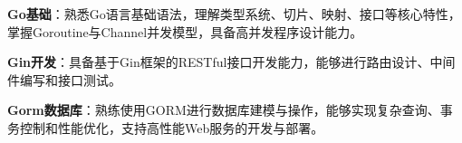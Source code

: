 \item \textbf{Go基础}：熟悉Go语言基础语法，理解类型系统、切片、映射、接口等核心特性，掌握Goroutine与Channel并发模型，具备高并发程序设计能力。
\item \textbf{Gin开发}：具备基于Gin框架的RESTful接口开发能力，能够进行路由设计、中间件编写和接口测试。
\item \textbf{Gorm数据库}：熟练使用GORM进行数据库建模与操作，能够实现复杂查询、事务控制和性能优化，支持高性能Web服务的开发与部署。